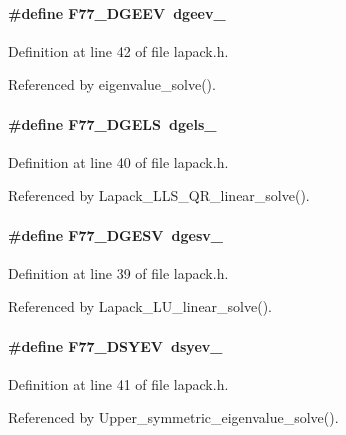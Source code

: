 \paragraph[{F77\_\-DGEEV}]{\setlength{\rightskip}{0pt plus 5cm}\#define F77\_\-DGEEV~dgeev\_\-}\hfill\label{lapack_8h_a03c36d7eed550c5c3f0474561ec6ba0a}


Definition at line 42 of file lapack.h.



Referenced by eigenvalue\_\-solve().

\paragraph[{F77\_\-DGELS}]{\setlength{\rightskip}{0pt plus 5cm}\#define F77\_\-DGELS~dgels\_\-}\hfill\label{lapack_8h_a1a979a68c68c7188390d19b8e3a71e1f}


Definition at line 40 of file lapack.h.



Referenced by Lapack\_\-LLS\_\-QR\_\-linear\_\-solve().

\paragraph[{F77\_\-DGESV}]{\setlength{\rightskip}{0pt plus 5cm}\#define F77\_\-DGESV~dgesv\_\-}\hfill\label{lapack_8h_a78b0396f6cb0dc34b89486a9fa8af01c}


Definition at line 39 of file lapack.h.



Referenced by Lapack\_\-LU\_\-linear\_\-solve().

\paragraph[{F77\_\-DSYEV}]{\setlength{\rightskip}{0pt plus 5cm}\#define F77\_\-DSYEV~dsyev\_\-}\hfill\label{lapack_8h_afd28630502925316bb87b8e3edae87cd}


Definition at line 41 of file lapack.h.



Referenced by Upper\_\-symmetric\_\-eigenvalue\_\-solve().



